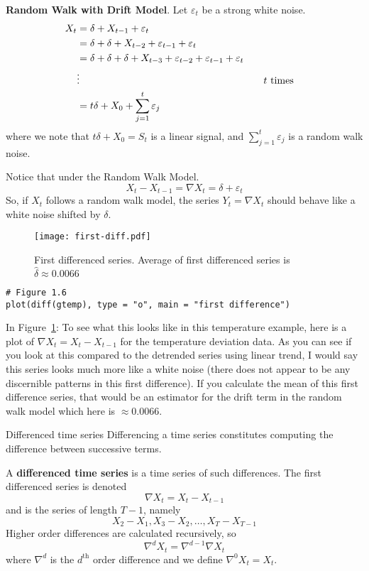 \textbf{Random Walk with Drift Model}. Let $ \varepsilon_t $ be a strong white noise.
\begin{align*}
    X_t
     & =\delta+X_{t-1}+\varepsilon_t                                                                                  \\
     & =\delta+\delta+X_{t-2}+\varepsilon_{t-1}+\varepsilon_t                                                         \\
     & =\delta+\delta+\delta+X_{t-3}+\varepsilon_{t-2}+\varepsilon_{t-1}+\varepsilon_{t}                              \\
     & \vdots                                                                            & \quad & \text{$ t $ times} \\
     & =t\delta+X_0+\sum_{j=1}^{t} \varepsilon_j
\end{align*}
where we note that $ t\delta+X_0=S_t $ is a linear signal,
and $ \sum_{j=1}^{t} \varepsilon_j $ is a
random walk noise.

Notice that under the Random Walk Model.
\[ X_t-X_{t-1}=\nabla X_t=\delta+\varepsilon_t \]
So, if $ X_t $ follows a random walk model, the series $ Y_t=\nabla X_t $
should behave like a white noise shifted by $ \delta $.
\begin{figure}[!ht]
    \centering
    \texttt{[image: first-diff.pdf]}
    \caption{First differenced series. Average of first differenced series
        is $ \hat{\delta}\approx 0.0066 $}\label{fig:firstdiff}
\end{figure}
\begin{verbatim}
# Figure 1.6
plot(diff(gtemp), type = "o", main = "first difference")
\end{verbatim}
In Figure~\ref{fig:firstdiff}:
{\color{blue}To see what this looks like in this temperature example, here is a plot
of $ \nabla X_t=X_t-X_{t-1} $ for the temperature deviation data. As you can
see if you look at this compared to the detrended series using linear trend,
I would say this series looks much more like a white noise (there does not
appear to be any discernible patterns in this first difference). If you calculate the mean
of this first difference series, that would be an estimator for the drift term
in the random walk model which here is $ \approx 0.0066 $.}

\begin{Definition}{Differenced time series}{}
    Differencing a time series constitutes
    computing the difference between successive terms.

    A \textbf{differenced time series} is a time series of such differences.
    The first differenced series is denoted
    \[ \nabla X_t=X_t-X_{t-1} \]
    and is the series of length $ T-1 $, namely
    \[ X_2-X_1,X_3-X_2,\ldots,X_T-X_{T-1} \]
    Higher order differences are calculated recursively, so
    \[ \nabla^d X_t=\nabla^{d-1}\nabla X_t \]
    where $ \nabla^d $ is the $ d^{\text{th}} $ order difference and
    we define $ \nabla^0 X_t=X_t $.
\end{Definition}

